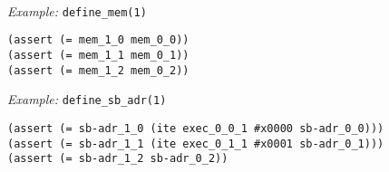~\\
\noindent
\emph{Example:} \lstinline[style=c++]{define_mem(1)}

\begin{lstlisting}[language=SMTLib]
(assert (= mem_1_0 mem_0_0))
(assert (= mem_1_1 mem_0_1))
(assert (= mem_1_2 mem_0_2))
\end{lstlisting}



\newpage

\noindent
\emph{Example:} \lstinline[style=c++]{define_sb_adr(1)}

\begin{lstlisting}[language=SMTLib]
(assert (= sb-adr_1_0 (ite exec_0_0_1 #x0000 sb-adr_0_0)))
(assert (= sb-adr_1_1 (ite exec_0_1_1 #x0001 sb-adr_0_1)))
(assert (= sb-adr_1_2 sb-adr_0_2))
\end{lstlisting}



